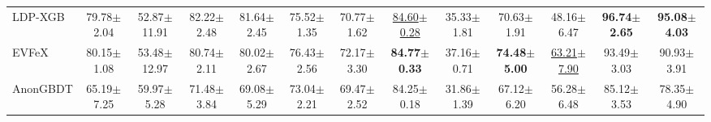 \begin{table}[!t]
{\begin{tabular}{lcccccccccccc}
LDP-XGB & 79.78\(\pm\)2.04 & 52.87\(\pm\)11.91 & 82.22\(\pm\)2.48 & 81.64\(\pm\)2.45 & 75.52\(\pm\)1.35 & 70.77\(\pm\)1.62 & \underline{84.60\(\pm\)0.28} & 35.33\(\pm\)1.81 & 70.63\(\pm\)1.91 & 48.16\(\pm\)6.47 & \textbf{96.74\(\pm\)2.65} & \textbf{95.08\(\pm\)4.03} \\
EVFeX & 80.15\(\pm\)1.08 & 53.48\(\pm\)12.97 & 80.74\(\pm\)2.11 & 80.02\(\pm\)2.67 & 76.43\(\pm\)2.56 & 72.17\(\pm\)3.30 & \textbf{84.77\(\pm\)0.33} & 37.16\(\pm\)0.71 & \textbf{74.48\(\pm\)5.00} & \underline{63.21\(\pm\)7.90} & 93.49\(\pm\)3.03 & 90.93\(\pm\)3.91 \\
AnonGBDT & 65.19\(\pm\)7.25 & 59.97\(\pm\)5.28 & 71.48\(\pm\)3.84 & 69.08\(\pm\)5.29 & 73.04\(\pm\)2.21 & 69.47\(\pm\)2.52 & 84.25\(\pm\)0.18 & 31.86\(\pm\)1.39 & 67.12\(\pm\)6.20 & 56.28\(\pm\)6.48 & 85.12\(\pm\)3.53 & 78.35\(\pm\)4.90 \\
\bottomrule
\end{tabular}%
}
\end{table}
